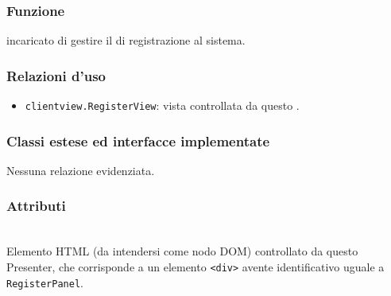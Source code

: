 
\subsubsection*{Funzione}
 incaricato di gestire il  di registrazione al sistema.

\subsubsection*{Relazioni d'uso}
\begin{itemize}
  \item \texttt{clientview.RegisterView}: vista controllata da questo .
\end{itemize}

\subsubsection*{Classi estese ed interfacce implementate}
Nessuna relazione evidenziata.

\subsubsection*{Attributi}
\begin{description}
  \item{}\\
  Elemento HTML (da intendersi come nodo DOM) controllato da questo Presenter, che corrisponde a un elemento \verb'<div>' avente identificativo uguale a \verb'RegisterPanel'.
\end{description}

